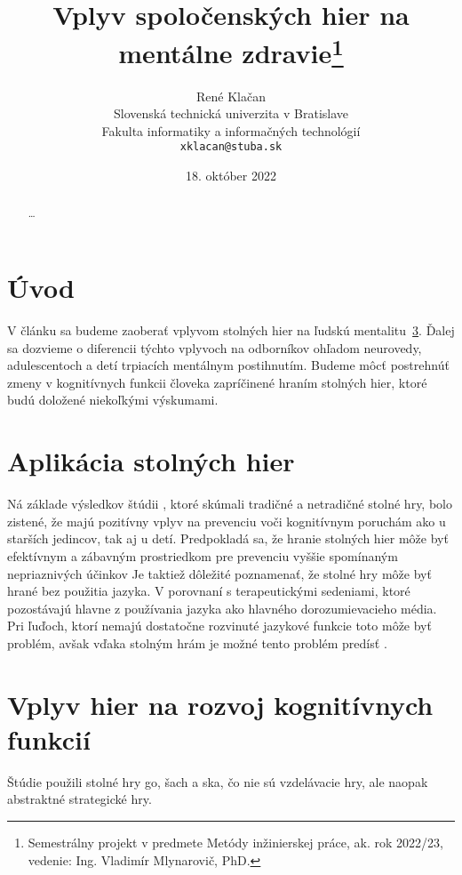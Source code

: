 \documentclass[10pt,oneside,slovak,a4paper]{article}
\title{Vplyv spoločenských hier na mentálne zdravie\thanks{Semestrálny projekt v predmete Metódy inžinierskej práce, ak. rok 2022/23, vedenie: Ing. Vladimír Mlynarovič, PhD.}} %
\author{René Klačan\\[2pt]
	{\small Slovenská technická univerzita v Bratislave}\\
	{\small Fakulta informatiky a informačných technológií}\\
	{\small \texttt{xklacan@stuba.sk}}
	}
\date{\small 18. október 2022}
\begin{document}
\maketitle
\begin{abstract}
\ldots
\end{abstract}



\section{Úvod}

V článku sa budeme zaoberať vplyvom stolných hier na ľudskú mentalitu~\ref{hry_kognitivne_funkcie}. Ďalej sa dozvieme o diferencii týchto vplyvoch na odborníkov ohľadom neurovedy, adulescentoch a detí trpiacích mentálnym postihnutím. Budeme môcť postrehnúť zmeny v kognitívnych funkcii človeka zapríčinené hraním stolných hier, ktoré budú doložené niekoľkými výskumami.


\section{Aplikácia stolných hier} \label{aplikacie_hier}
Ná základe výsledkov štúdii \cite{Nakao:BG}, ktoré skúmali tradičné a netradičné stolné hry, bolo zistené, že majú pozitívny vplyv na prevenciu voči kognitívnym poruchám ako u starších jedincov, tak aj u detí.
Predpokladá sa, že hranie stolných hier môže byť efektívnym a zábavným prostriedkom pre prevenciu vyššie spomínaným nepriaznivých účinkov \cite{Edu:GFH}
Je taktiež dôležité poznamenať, že stolné hry môže byť hrané bez použitia jazyka. V porovnaní s terapeutickými sedeniami, ktoré pozostávajú hlavne z používania jazyka ako hlavného dorozumievacieho média. Pri ľuďoch, ktorí nemajú dostatočne rozvinuté jazykové funkcie toto môže byť problém, avšak vďaka stolným hrám je možné tento problém predísť \cite{Charlier:2013}.

\section{Vplyv hier na rozvoj kognitívnych funkcií} \label{hry_kognitivne_funkcie}
Štúdie \cite{} použili stolné hry go, šach a ska, čo nie sú vzdelávacie hry, ale naopak abstraktné strategické hry.
\end{document}
